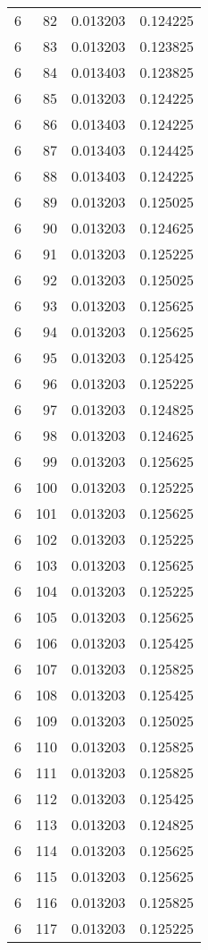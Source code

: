 \begin{longtable}{rrrr}
6 & 82 & 0.013203 & 0.124225 \\
6 & 83 & 0.013203 & 0.123825 \\
6 & 84 & 0.013403 & 0.123825 \\
6 & 85 & 0.013203 & 0.124225 \\
6 & 86 & 0.013403 & 0.124225 \\
6 & 87 & 0.013403 & 0.124425 \\
6 & 88 & 0.013403 & 0.124225 \\
6 & 89 & 0.013203 & 0.125025 \\
6 & 90 & 0.013203 & 0.124625 \\
6 & 91 & 0.013203 & 0.125225 \\
6 & 92 & 0.013203 & 0.125025 \\
6 & 93 & 0.013203 & 0.125625 \\
6 & 94 & 0.013203 & 0.125625 \\
6 & 95 & 0.013203 & 0.125425 \\
6 & 96 & 0.013203 & 0.125225 \\
6 & 97 & 0.013203 & 0.124825 \\
6 & 98 & 0.013203 & 0.124625 \\
6 & 99 & 0.013203 & 0.125625 \\
6 & 100 & 0.013203 & 0.125225 \\
6 & 101 & 0.013203 & 0.125625 \\
6 & 102 & 0.013203 & 0.125225 \\
6 & 103 & 0.013203 & 0.125625 \\
6 & 104 & 0.013203 & 0.125225 \\
6 & 105 & 0.013203 & 0.125625 \\
6 & 106 & 0.013203 & 0.125425 \\
6 & 107 & 0.013203 & 0.125825 \\
6 & 108 & 0.013203 & 0.125425 \\
6 & 109 & 0.013203 & 0.125025 \\
6 & 110 & 0.013203 & 0.125825 \\
6 & 111 & 0.013203 & 0.125825 \\
6 & 112 & 0.013203 & 0.125425 \\
6 & 113 & 0.013203 & 0.124825 \\
6 & 114 & 0.013203 & 0.125625 \\
6 & 115 & 0.013203 & 0.125625 \\
6 & 116 & 0.013203 & 0.125825 \\
6 & 117 & 0.013203 & 0.125225 \\

\end{longtable}
